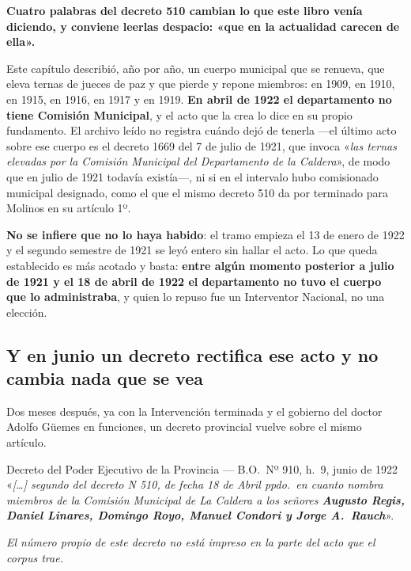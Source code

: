 \begin{cautela}
\textbf{Cuatro palabras del decreto 510 cambian lo que este libro venía diciendo, y conviene
leerlas despacio: «que en la actualidad carecen de ella».}

Este capítulo describió, año por año, un cuerpo municipal que se renueva, que eleva ternas de
jueces de paz y que pierde y repone miembros: en 1909, en 1910, en 1915, en 1916, en 1917 y en
1919. \textbf{En abril de 1922 el departamento no tiene Comisión Municipal}, y el acto que la crea
lo dice en su propio fundamento. El archivo leído no registra cuándo dejó de tenerla ---el último
acto sobre ese cuerpo es el decreto 1669 del 7 de julio de 1921, que invoca «\textit{las ternas
elevadas por la Comisión Municipal del Departamento de la Caldera}», de modo que en julio de 1921
todavía existía---, ni si en el intervalo hubo comisionado municipal designado, como el que el
mismo decreto 510 da por terminado para Molinos en su artículo 1º.

\textbf{No se infiere que no lo haya habido}: el tramo empieza el 13 de enero de 1922 y el
segundo semestre de 1921 se leyó entero sin hallar el acto. Lo que queda establecido es más
acotado y basta: \textbf{entre algún momento posterior a julio de 1921 y el 18 de abril de 1922 el
departamento no tuvo el cuerpo que lo administraba}, y quien lo repuso fue un Interventor
Nacional, no una elección.
\end{cautela}

\subsection*{Y en junio un decreto rectifica ese acto y no cambia nada que se vea}

Dos meses después, ya con la Intervención terminada y el gobierno del doctor Adolfo Güemes en
funciones, un decreto provincial vuelve sobre el mismo artículo.

\begin{ficha}{Decreto del Poder Ejecutivo de la Provincia --- B.O.\ Nº 910, h.\ 9, junio de 1922}
«\textit{[\ldots] segundo del decreto N 510, de fecha 18 de Abril ppdo.\ en cuanto nombra miembros
de la Comisión Municipal de La Caldera a los señores \textbf{Augusto Regis, Daniel Linares,
Domingo Royo, Manuel Condori y Jorge A.\ Rauch}}».

\textit{El número propio de este decreto no está impreso en la parte del acto que el corpus trae.}
\end{ficha}

